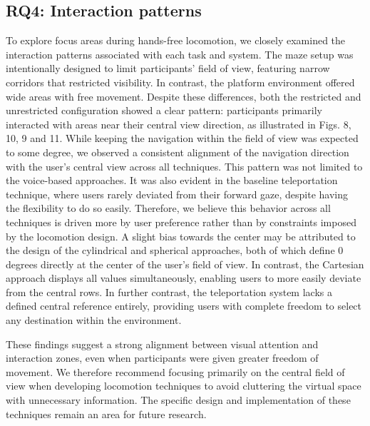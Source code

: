\documentclass[preprint,12pt]{elsarticle}
\newcommand{\reftext}[1]{{\color{gray}#1}}   %
\begin{document}
\subsection{RQ4: Interaction patterns}
\reftext{To explore focus areas during hands-free locomotion, we closely examined the interaction patterns associated with each task and system. The maze setup was intentionally designed to limit participants' field of view, featuring narrow corridors that restricted visibility. In contrast, the platform environment offered wide areas with free movement. Despite these differences, both the restricted and unrestricted configuration showed a clear pattern: participants primarily interacted with areas near their central view direction, as illustrated in Figs. 8, 10, 9 and 11. While keeping the navigation within the field of view was expected to some degree, we observed a consistent alignment of the navigation direction with the user's central view across all techniques. This pattern was not limited to the voice-based approaches. It was also evident in the baseline teleportation technique, where users rarely deviated from their forward gaze, despite having the flexibility to do so easily. Therefore, we believe this behavior across all techniques is driven more by user preference rather than by constraints imposed by the locomotion design. A slight bias towards the center may be attributed to the design of the cylindrical and spherical approaches, both of which define 0 degrees directly at the center of the user's field of view. In contrast, the Cartesian approach displays all values simultaneously, enabling users to more easily deviate from the central rows. In further contrast, the teleportation system lacks a defined central reference entirely, providing users with complete freedom to select any destination within the environment.}

\reftext{These findings suggest a strong alignment between visual attention and interaction zones, even when participants were given greater freedom of movement. We therefore recommend focusing primarily on the central field of view when developing locomotion techniques to avoid cluttering the virtual space with unnecessary information. The specific design and implementation of these techniques remain an area for future research.}
\end{document}
